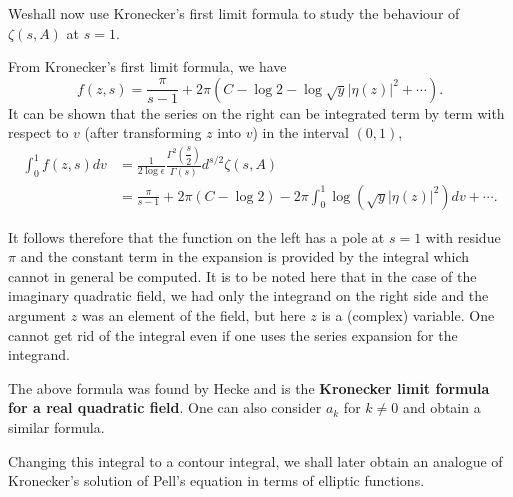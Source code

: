 We\pageoriginale shall now use Kronecker's first limit formula to
study the behaviour of $\zeta(s,A)$ at $s=1$.

From Kronecker's first limit formula, we have
$$
f(z,s)=\frac{\pi}{s-1}+2\pi(C-\log
2-\log\sqrt{y}|\eta(z)|^{2}+\cdots).
$$
It can be shown that the series on the right can be integrated term by
term with respect to $v$ (after transforming $z$ into $v$) in the
interval $(0,1)$, \ie
\begin{align*}
\int^{1}_{0}f(z,s)dv &= \frac{1}{2\log
  \epsilon}\frac{\Gamma^{2}\left(\dfrac{s}{2}\right)}{\Gamma(s)}d^{s/2}\zeta(s,A)\\
&= \frac{\pi}{s-1}+2\pi(C-\log 2)-2\pi
\int^{1}_{0}\log(\sqrt{y}|\eta(z)|^{2})dv+\cdots. 
\end{align*}

It follows therefore that the function on the left has a pole at $s=1$
with residue $\pi$ and the constant term in the expansion is provided
by the integral which cannot in general be computed. It is to be noted
here that in the case of the imaginary quadratic field, we had only
the integrand on the right side and the argument $z$ was an element of
the field, but here $z$ is a (complex) variable. One cannot get rid of
the integral even if one uses the series expansion for the integrand.

The above formula was found by Hecke and is the {\bf Kronecker limit
  formula for a real quadratic field}. One can also consider $a_{k}$
for $k\neq 0$ and obtain a similar formula.

Changing this integral to a contour integral, we shall later obtain an
analogue of Kronecker's solution of Pell's equation in terms of
elliptic functions.

